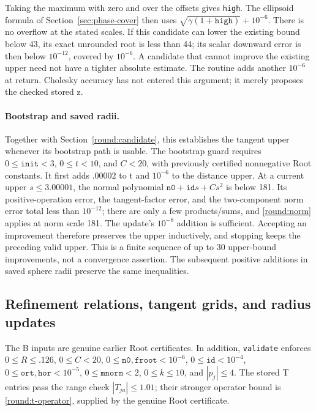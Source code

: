 Taking the maximum with zero and over the offsets gives
\texttt{high}.  The ellipsoid formula of
Section~\ref{sec:phase-cover} then uses
$\sqrt{\gamma(1+\mathtt{high})}+10^{-6}$.
There is no overflow at the stated scales.  If this candidate can
lower the existing bound below 43, its exact unrounded root is less
than 44; its scalar downward error is then below $10^{-12}$,
covered by $10^{-6}$.  A candidate that cannot improve the existing
upper need not have a tighter absolute estimate.  The routine adds
another $10^{-6}$ at return.  Cholesky accuracy has not entered this
argument; it merely proposes the checked stored z.

\paragraph{Bootstrap and saved radii.}
Together with Section~\ref{round:candidate}, this establishes the
tangent upper whenever its bootstrap path is usable.
The bootstrap guard requires $0\le\mathtt{init}<3$, $0\le t<10$,
and $C<20$, with previously certified nonnegative Root constants.
It first adds $.00002$ to t and $10^{-6}$ to the distance upper.
At a current upper $s\le3.00001$, the normal polynomial
$\mathtt{n0}+\mathtt{id}s+Cs^2$ is below 181.
Its positive-operation error, the tangent-factor error, and the
two-component norm error total less than $10^{-12}$; there are only
a few products/sums, and \eqref{round:norm} applies at norm scale 181.
The update's $10^{-8}$ addition is sufficient.  Accepting an
improvement therefore preserves the upper inductively, and stopping
keeps the preceding valid upper.  This is a finite sequence of up
to 30 upper-bound improvements, not a convergence assertion.
The subsequent positive additions in saved sphere radii preserve
the same inequalities.

\subsection{Refinement relations, tangent grids, and radius updates}
\label{round:refinement}

The B inputs are genuine earlier Root certificates.  In addition,
\texttt{validate} enforces $0\le R\le.126$, $0\le C<20$,
$0\le\mathtt{n0},\mathtt{froot}<10^{-6}$,
$0\le\mathtt{id}<10^{-4}$,
$0\le\mathtt{ort},\mathtt{hor}<10^{-5}$,
$0\le\mathtt{mnorm}<2$, $0\le k\le10$, and $|p_j|\le4$.
The stored T entries pass the range check $|T_{ja}|\le1.01$;
their stronger operator bound is
\eqref{round:t-operator}, supplied by the genuine Root certificate.

